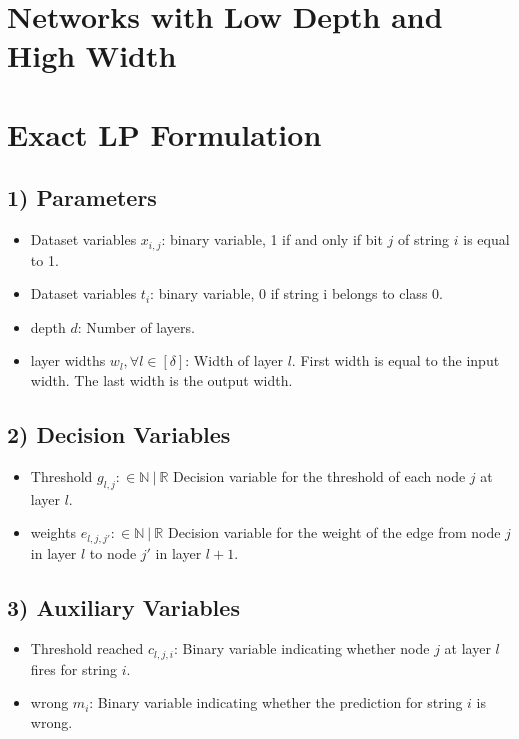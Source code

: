 \section{Networks with Low Depth and High Width}


\section{Exact LP Formulation}



\subsection*{1) Parameters}
\begin{itemize}
    \item Dataset variables $x_{i,j}$: binary variable, 1 if and only if bit $j$ of string $i$ is equal to 1. 
    \item Dataset variables $t_{i}$: binary variable, 0 if string i belongs to class 0.
    \item depth $d$: Number of layers. 
    \item layer widths $w_l,  \forall l \in [\delta]$: Width of layer $l$. First width is equal to the input width. The last width is the output width.
\end{itemize}

\subsection*{2) Decision Variables}
\begin{itemize}
   \item  Threshold $g_{l,j}: \in \mathbb{N} \ |\  \mathbb{R}$ Decision variable for the threshold of each node $j$ at layer $l$. \\
   \item  weights $e_{l,j,j'}: \in \mathbb{N} \ |\  \mathbb{R}$  Decision variable for the weight of the edge from node $j$ in layer $l$ to node $j'$ in layer  $l+1$. \\ 
\end{itemize}

\subsection*{3) Auxiliary Variables}
\begin{itemize}
    \item Threshold reached $c_{l,j,i}$: Binary variable indicating whether node $j$ at layer $l$ fires for string $i$. \\ 
    \item wrong $m_i$: Binary variable indicating whether the prediction for string $i$ is wrong.
\end{itemize}




